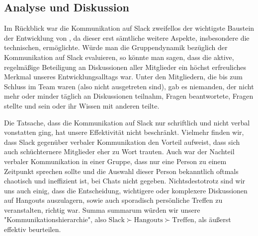 
\subsection{Analyse und Diskussion}
\label{team:group-anal}

Im Rückblick war die Kommunikation auf Slack zweifellos der wichtigste Baustein
der Entwicklung von \erasim{}, da dieser erst sämtliche weitere Aspekte,
insbesondere die technischen, ermöglichte. Würde man die Gruppendynamik
bezüglich der Kommunikation auf Slack evaluieren, so könnte man sagen, dass die
aktive, regelmäßige Beteiligung an Diskussionen aller Mitglieder ein höchst
erfreuliches Merkmal unseres Entwicklungsalltags war. Unter den Mitgliedern, die
bis zum Schluss im \erasim{} Team waren (also nicht ausgetreten sind), gab
es niemanden, der nicht mehr oder minder täglich an Diskussionen teilnahm,
Fragen beantwortete, Fragen stellte und sein oder ihr Wissen mit anderen teilte.

Die Tatsache, dass die Kommunikation auf Slack nur schriftlich und nicht verbal
vonstatten ging, hat unsere Effektivität nicht beschränkt. Vielmehr finden wir,
dass Slack gegenüber verbaler Kommunikation den Vorteil aufweist, dass sich auch
schüchternere Mitglieder eher zu Wort trauten. Auch war der Nachteil verbaler
Kommunikation in einer Gruppe, dass nur eine Person zu einem Zeitpunkt sprechen
sollte und die Auswahl dieser Person bekanntlich oftmals chaotisch und
ineffizient ist, bei Chats nicht gegeben. Nichtsdestotrotz sind wir uns auch
einig, dass die Entscheidung, wichtigere oder komplexere Diskussionen auf
Hangouts auszulagern, sowie auch sporadisch persönliche Treffen zu veranstalten,
richtig war. Summa summarum würden wir unsere "Kommunikationshierarchie", also
$\text{Slack} \succ \text{Hangouts} \succ \text{Treffen}$, als äußerst effektiv
beurteilen.

